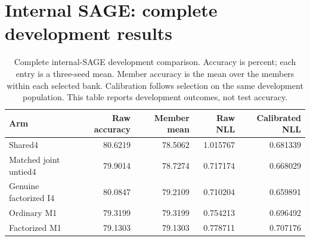 \section{Internal SAGE: complete development results}\label{app:internal-sage-F}
\begin{table}[t]
\centering\small
\setlength{\tabcolsep}{4pt}
\caption{Complete internal-SAGE development comparison. Accuracy is percent; each entry is a three-seed mean. Member accuracy is the mean over the members within each selected bank. Calibration follows selection on the same development population. This table reports development outcomes, not test accuracy.}
\label{tab:internal-sage-F}
\begin{tabular}{lrrrr}
\toprule
Arm & Raw accuracy & Member mean & Raw NLL & Calibrated NLL\\
\midrule
Shared4 & 80.6219 & 78.5062 & 1.015767 & 0.681339\\
Matched joint untied4 & 79.9014 & 78.7274 & 0.717174 & 0.668029\\
Genuine factorized I4 & 80.0847 & 79.2109 & 0.710204 & 0.659891\\
Ordinary M1 & 79.3199 & 79.3199 & 0.754213 & 0.696492\\
Factorized M1 & 79.1303 & 79.1303 & 0.778711 & 0.707176\\
\bottomrule
\end{tabular}
\end{table}
